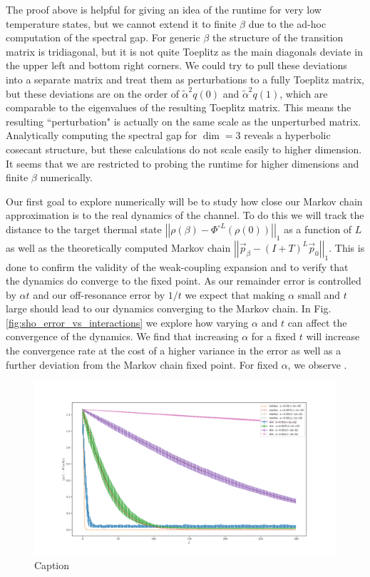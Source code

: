 \documentclass{article}
\newcommand{\norm}[1]{\left| \left| #1 \right| \right|}
\begin{document}
The proof above is helpful for giving an idea of the runtime for very low temperature states, but we cannot extend it to finite $\beta$ due to the ad-hoc computation of the spectral gap. For generic $\beta$ the structure of the transition matrix is tridiagonal, but it is not quite Toeplitz as the main diagonals deviate in the upper left and bottom right corners. We could try to pull these deviations into a separate matrix and treat them as perturbations to a fully Toeplitz matrix, but these deviations are on the order of $\widetilde{\alpha}^2 q(0)$ and $\widetilde{\alpha}^2 q(1)$, which are comparable to the eigenvalues of the resulting Toeplitz matrix. This means the resulting ``perturbation" is actually on the same scale as the unperturbed matrix. Analytically computing the spectral gap for $\dim = 3$ reveals a hyperbolic cosecant structure, but these calculations do not scale easily to higher dimension. It seems that we are restricted to probing the runtime for higher dimensions and finite $\beta$ numerically.

Our first goal to explore numerically will be to study how close our Markov chain approximation is to the real dynamics of the channel. To do this we will track the distance to the target thermal state $\norm{\rho(\beta) - \Phi^{\circ L}(\rho(0))}_1$ as a function of $L$ as well as the theoretically computed Markov chain $\norm{\vec{p}_{\beta} - (I + T)^L \vec{p}_0}_1 $. This is done to confirm the validity of the weak-coupling expansion and to verify that the dynamics do converge to the fixed point. As our remainder error is controlled by $\alpha t$ and our off-resonance error by $1/t$ we expect that making $\alpha$ small and $t$ large should lead to our dynamics converging to the Markov chain. In Fig. \ref{fig:sho_error_vs_interactions} we explore how varying $\alpha$ and $t$ can affect the convergence of the dynamics. We find that increasing $\alpha$ for a fixed $t$ will increase the convergence rate at the cost of a higher variance in the error as well as a further deviation from the Markov chain fixed point. For fixed $\alpha$, we observe .

\begin{figure}
    \centering
    \includegraphics[width=0.5\linewidth]{numerics/data/sho_error_vs_l.png}
    \caption{Caption}
    \label{fig:enter-label}
\end{figure}
\end{document}
